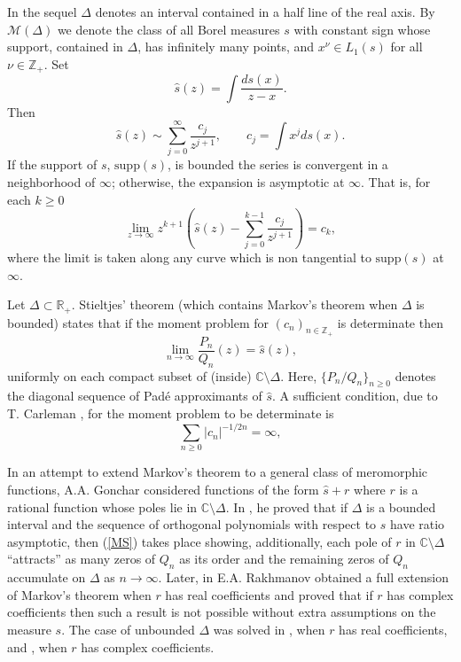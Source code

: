 \documentclass[10pt,a4paper]{article}
\theoremstyle{definition}
\theoremstyle{remark}
\numberwithin{equation}{section}
\begin{document}
In the sequel $\Delta$ denotes an interval contained in a half line of the real axis. By $\mathcal{M}(\Delta)$ we denote the class of all Borel measures $s$ with constant sign whose support, contained in $\Delta$, has infinitely many points, and $x^\nu \in L_1(s)$ for all $\nu \in \mathbb{Z}_+$. Set
\[ \displaystyle \widehat{s}(z) = \int\frac{d s(x)}{z-x}.
\]
Then
\begin{equation}\label{expansion}
\displaystyle \widehat{s}(z)  \sim  \sum_{j=0}^{\infty} \frac{c_j}{z^{j+1}}, \qquad c_j = \int x^j ds(x).
\end{equation}
If  the support  of $s$, $\mbox{supp}(s)$, is bounded  the series is convergent in a neighborhood of $\infty$; otherwise, the expansion is asymptotic at $\infty$. That is, for each $k \geq 0$
\[ \lim_{z \to \infty} z^{k+1}\left(\widehat{s}(z) - \sum_{j=0}^{k-1} \frac{c_j}{z^{j+1}}\right) = c_k,
\]
where the limit is taken along any curve which is non tangential to $\mbox{supp}(s)$ at $\infty$.

Let $\Delta \subset \mathbb{R}_+$. Stieltjes' theorem (which contains Markov's theorem when $\Delta$ is bounded) states that if the moment problem for $(c_n)_{n \in \mathbb{Z}_+}$ is determinate then
\begin{equation} \label{MS} \lim_{n\to \infty} \frac{P_n}{Q_n}(z) = \widehat{s}(z),
\end{equation}
uniformly on each compact subset of (inside) $\mathbb{C} \setminus \Delta$. Here, $\{P_n/Q_n\}_{n\geq 0}$ denotes the diagonal sequence of Pad\'e approximants of $\widehat{s}$. A sufficient condition, due to T. Carleman \cite{Car}, for the moment problem to be determinate is
\begin{equation}\label{Carle} \sum_{n \geq 0} |c_n|^{-1/2n} = \infty,
\end{equation}

In an attempt to extend Markov's theorem to a general class of meromorphic functions, A.A. Gonchar considered functions of the form $\widehat{s} + r$ where $r$ is a rational function whose poles lie in $\mathbb{C} \setminus \Delta$. In \cite{Gon0}, he proved that if  $\Delta$ is a bounded interval and the sequence of orthogonal polynomials with respect to $s$ have ratio asymptotic, then  (\ref{MS}) takes place showing, additionally, each pole of $r$ in $\mathbb{C} \setminus \Delta$ ``attracts'' as many zeros of $Q_n$ as its order and the remaining zeros of $Q_n$ accumulate on $\Delta$ as $n \to \infty$. Later, in \cite{Rak1} E.A. Rakhmanov obtained a full extension of Markov's theorem when $r$ has real coefficients and proved that if $r$ has complex coefficients then such a result is not possible  without extra assumptions on the measure $s$. The case of unbounded $\Delta$ was solved in \cite{L1}, when $r$ has real coefficients, and \cite{L2}, when $r$ has complex coefficients.
\end{document}
